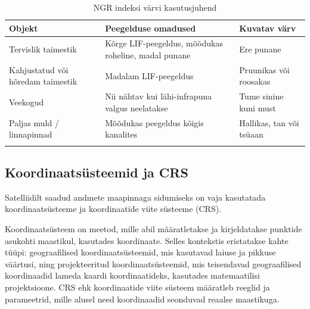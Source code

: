 \begin{longtable}{lp{5cm}l}
    \hline
    Objekt & Peegelduse omadused & Kuvatav värv                          \\ 
    \hline
    Tervislik taimestik & Kõrge LIF-peegeldus, mõõdukas roheline, madal punane & Ere punane \\
    Kahjustatud või hõredam taimestik & Madalam LIF-peegeldus & Pruunikas või roosakas \\
    Veekogud & 	Nii nähtav kui lähi-infrapuna valgus neelatakse & Tume sinine kuni must \\
    Paljas muld / linnapinnad & Mõõdukas peegeldus kõigis kanalites & Hallikas, tan või tsüaan\\
    \caption{NGR indeksi värvi kasutusjuhend}
    \label{tab:NGR_kasutus}
\end{longtable}

\subsection{Koordinaatsüsteemid ja CRS}
Satelliidilt saadud andmete maapinnaga sidumiseks on vaja kasutatada koordinaatsüsteeme ja
koordinaatide viite süsteeme (CRS).

Koordinaatsüsteem on meetod, mille abil määratletakse ja kirjeldatakse punktide
asukohti maastikul, kasutades koordinaate. Selles kontekstis eristatakse kahte
tüüpi: geograafilised koordinaatsüsteemid, mis kasutavad laiuse ja pikkuse
väärtusi, ning projekteeritud koordinaatsüsteemid, mis teisendavad
geograafilised koordinaadid lameda kaardi koordinaatideks, kasutades
matemaatilisi projektsioone. CRS ehk koordinaatide viite süsteem määratleb
reeglid ja parameetrid, mille alusel need koordinaadid seonduvad reaalse
maastikuga. \cite{8CoordinateReference}

